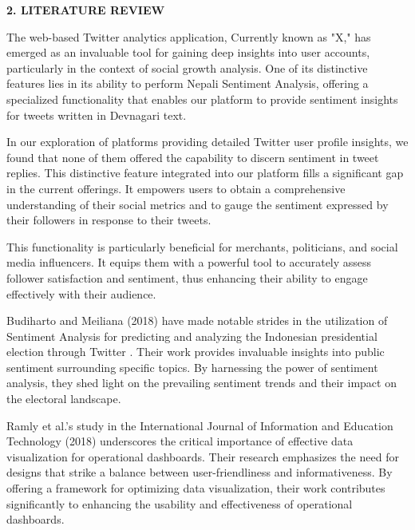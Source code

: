 \documentclass[a4paper,12pt]{article}
\begin{document}
{{{\begin{enumerate}
		\end{enumerate}


  
								
								

		\newpage
								
		\begin{flushleft}
			\fontsize{14}{16}\selectfont\textbf{2. LITERATURE REVIEW}
			\label{page5}
		\end{flushleft}

The web-based Twitter analytics application, Currently known as "X," has emerged as an invaluable tool for gaining deep insights into user accounts, particularly in the context of social growth analysis. One of its distinctive features lies in its ability to perform Nepali Sentiment Analysis, offering a specialized functionality that enables our platform to provide sentiment insights for tweets written in Devnagari text.

In our exploration of platforms providing detailed Twitter user profile insights, we found that none of them offered the capability to discern sentiment in tweet replies. This distinctive feature integrated into our platform fills a significant gap in the current offerings. It empowers users to obtain a comprehensive understanding of their social metrics and to gauge the sentiment expressed by their followers in response to their tweets.

This functionality is particularly beneficial for merchants, politicians, and social media influencers. It equips them with a powerful tool to accurately assess follower satisfaction and sentiment, thus enhancing their ability to engage effectively with their audience.

Budiharto and Meiliana (2018) have made notable strides in the utilization of Sentiment Analysis for predicting and analyzing the Indonesian presidential election through Twitter \cite{budiharto2018prediction}. Their work provides invaluable insights into public sentiment surrounding specific topics. By harnessing the power of sentiment analysis, they shed light on the prevailing sentiment trends and their impact on the electoral landscape.

Ramly et al.'s \cite{ramly2018comparative} study in the International Journal of Information and Education Technology (2018) underscores the critical importance of effective data visualization for operational dashboards. Their research emphasizes the need for designs that strike a balance between user-friendliness and informativeness. By offering a framework for optimizing data visualization, their work contributes significantly to enhancing the usability and effectiveness of operational dashboards.

}}}
\end{document}
